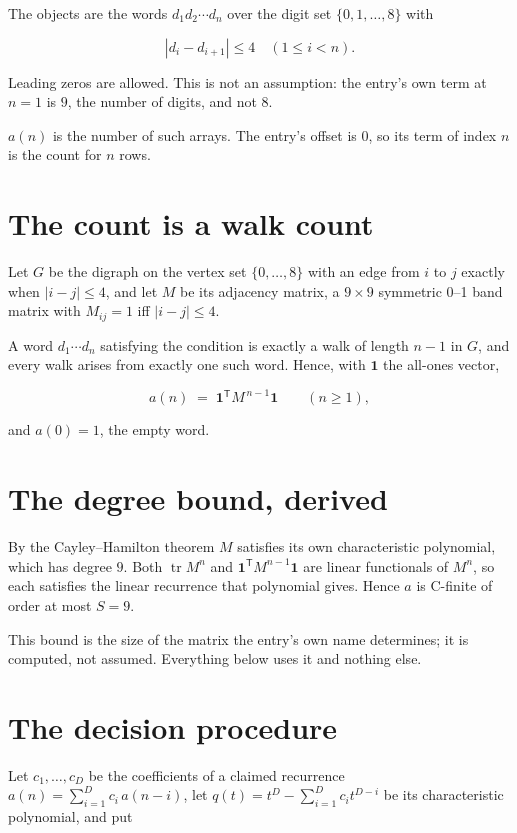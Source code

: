 \documentclass[11pt]{article}
\theoremstyle{definition}
\begin{document}
The objects are the words $d_1 d_2 \cdots d_n$ over the digit set $\{0,1,\dots,8\}$ with

\[|d_i - d_{i+1}| \le 4\quad (1 \le i < n).\]

Leading zeros are allowed. This is not an assumption: the entry's own term at $n=1$ is $9$, the number of digits, and not $8$.

$a(n)$ is the number of such arrays. The entry's offset is 0, so its term of index $n$ is the count for $n$ rows.

\section{The count is a walk count}

Let $G$ be the digraph on the vertex set $\{0,\dots,8\}$ with an edge from $i$ to $j$ exactly when $|i-j| \le 4$, and let $M$ be its adjacency matrix, a $9 \times 9$ symmetric 0--1 band matrix with $M_{ij} = 1$ iff $|i-j| \le 4$.

A word $d_1\cdots d_n$ satisfying the condition is exactly a walk of length $n-1$ in $G$, and every walk arises from exactly one such word. Hence, with $\mathbf 1$ the all-ones vector,

\[a(n) \;=\; \mathbf 1^{\mathsf T} M^{\,n-1} \mathbf 1 \qquad (n \ge 1),\]

and $a(0) = 1$, the empty word.

\section{The degree bound, derived}

By the Cayley--Hamilton theorem $M$ satisfies its own characteristic polynomial, which has degree $9$. Both $\operatorname{tr} M^n$ and $\mathbf 1^{\mathsf T} M^{n-1} \mathbf 1$ are linear functionals of $M^{n}$, so each satisfies the linear recurrence that polynomial gives. Hence $a$ is C-finite of order at most $S = 9$.

This bound is the size of the matrix the entry's own name determines; it is computed, not assumed. Everything below uses it and nothing else.

\section{The decision procedure}

Let $c_1,\dots,c_D$ be the coefficients of a claimed recurrence $a(n) = \sum_{i=1}^{D} c_i\,a(n-i)$, let $q(t) = t^{D} - \sum_{i=1}^{D} c_i t^{D-i}$ be its characteristic polynomial, and put
\end{document}
